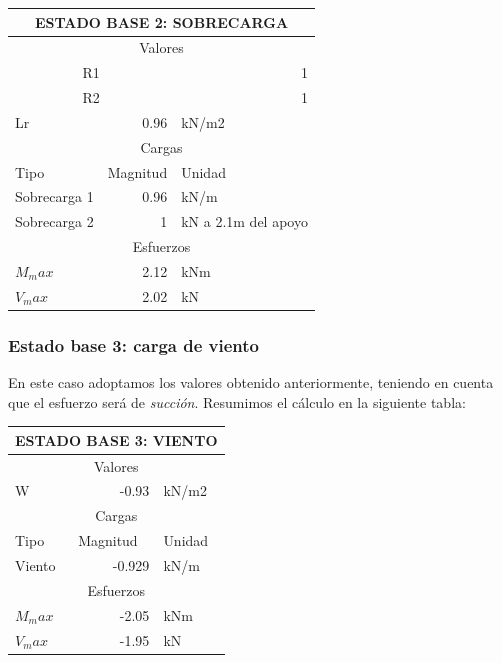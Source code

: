 \documentclass[../main.tex]{subfiles}
\begin{document}
\begin{table}[htbp]
  \centering
    \begin{tabular}{|l|r|l|}
    \hline
    \multicolumn{3}{|c|}{\textbf{ESTADO BASE 2: SOBRECARGA}} \bigstrut\\
    \hline
    \multicolumn{3}{|c|}{Valores} \bigstrut\\
    \hline
    \multicolumn{2}{|c|}{R1} & \multicolumn{1}{r|}{1} \bigstrut\\
    \hline
    \multicolumn{2}{|c|}{R2} & \multicolumn{1}{r|}{1} \bigstrut\\
    \hline
    Lr    & 0.96  & kN/m2 \bigstrut\\
    \hline
    \multicolumn{3}{|c|}{Cargas} \bigstrut\\
    \hline
    Tipo  & \multicolumn{1}{l|}{Magnitud} & Unidad \bigstrut\\
    \hline
    Sobrecarga 1 & 0.96  & kN/m \bigstrut\\
    \hline
    Sobrecarga 2 & 1     & kN a 2.1m del apoyo \bigstrut\\
    \hline
    \multicolumn{3}{|c|}{Esfuerzos} \bigstrut\\
    \hline
    $M_max$  & 2.12  & kNm \bigstrut\\
    \hline
    $V_max$  & 2.02  & kN \bigstrut\\
    \hline
    \end{tabular}%
  \label{tab:addlabel}%
\end{table}%

\subsubsection{Estado base 3: carga de viento}

En este caso adoptamos los valores obtenido anteriormente, teniendo en cuenta
que el esfuerzo será de \textit{succión}. Resumimos el cálculo en la siguiente
tabla:

\begin{table}[htbp]
  \centering
    \begin{tabular}{|l|r|l|}
    \hline
    \multicolumn{3}{|c|}{\textbf{ESTADO BASE 3: VIENTO}} \bigstrut\\
    \hline
    \multicolumn{3}{|c|}{Valores} \bigstrut\\
    \hline
    W     & \textcolor[rgb]{ 0,  .439,  .753}{-0.93} & kN/m2 \bigstrut\\
    \hline
    \multicolumn{3}{|c|}{Cargas} \bigstrut\\
    \hline
    Tipo  & \multicolumn{1}{l|}{Magnitud} & Unidad \bigstrut\\
    \hline
    Viento & -0.929 & kN/m \bigstrut\\
    \hline
    \multicolumn{3}{|c|}{Esfuerzos} \bigstrut\\
    \hline
    $M_max$  & -2.05 & kNm \bigstrut\\
    \hline
    $V_max$  & -1.95 & kN \bigstrut\\
    \hline
    \end{tabular}%
  \label{tab:addlabel}%
\end{table}%
\end{document}
